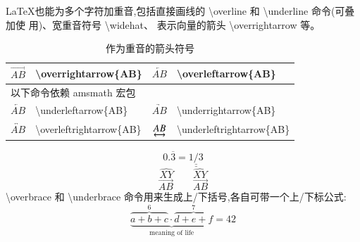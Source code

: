 \documentclass[a4paper]{ctexart}
\begin{document}
    \LaTeX 也能为多个字符加重音,包括直接画线的 \textbackslash overline 和 %
    \textbackslash underline 命令(可叠加使 用)、宽重音符号 \textbackslash widehat、%
    表示向量的箭头 \textbackslash overrightarrow 等。\par
    \begin{table}[H]
        \centering
        \caption{作为重音的箭头符号}
        \begin{tabular}{clcl}
            \toprule
            $\overrightarrow{AB}$           & \textbackslash overrightarrow\{AB\}           &
            $\overleftarrow{AB}$            & \textbackslash overleftarrow\{AB\}            \\
            \midrule
            \multicolumn{4}{l}{以下命令依赖 amsmath 宏包}\\
            $\underleftarrow{AB}$           & \textbackslash underleftarrow\{AB\}           &
            $\underrightarrow{AB}$          & \textbackslash underrightarrow\{AB\}          \\
            $\overleftrightarrow{AB}$       & \textbackslash overleftrightarrow\{AB\}       &
            $\underleftrightarrow{AB}$      & \textbackslash underleftrightarrow\{AB\}      \\
            \bottomrule
        \end{tabular}
    \end{table}
    \[0.\overline{3} = \underline{\underline{1/3}} \]
    \[\hat{XY} \qquad \widehat{XY} \]
    \[\vec{AB} \qquad \overrightarrow{AB} \]
    \textbackslash overbrace 和 \textbackslash underbrace 命令用来生成上/下括号,各自可带一个上/下标公式:
    \[
        \underbrace{\overbrace{a + b + c}^6 \cdot 
                    \overbrace{d + e + f}^7
                    }_\text{meaning of life} = 
        42
    \]
\end{document}

